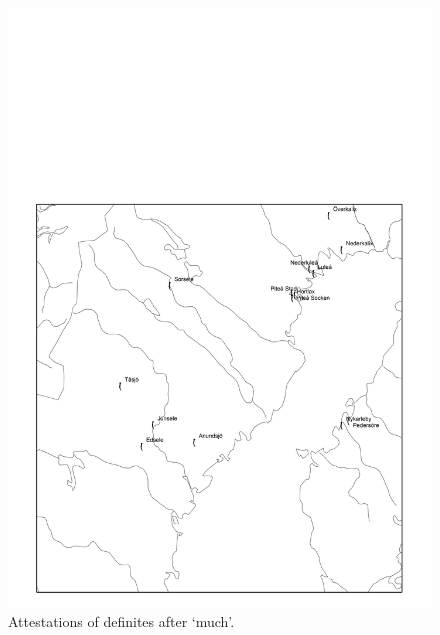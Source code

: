\begin{figure}[h]

\includegraphics[height=.5\textheight]{figures/15_AttestationsofDefinites}
\caption{Attestations of definites after ‘much’.}
\label{map:12}

\end{figure}

